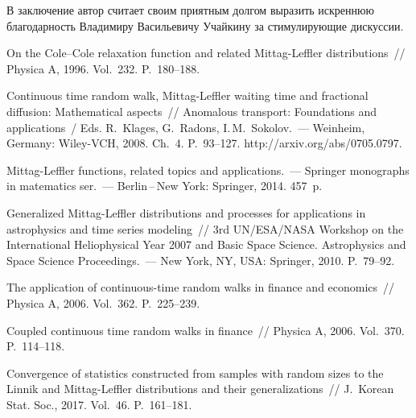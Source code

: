 \begin{multicols}{2}
\smallskip

В заключение автор считает своим приятным долгом выразить искреннюю
благодарность Владимиру Васильевичу Учайкину за стимулирующие
дискуссии.

\vspace*{-6pt}

{\small\frenchspacing
 {%
 \begin{thebibliography}{99}
 
 \vspace*{-2pt}
 
 On the Cole--Cole relaxation function and
related Mittag-Leffler distributions~// Physica A, 1996. Vol.~232.
P.~180--188.

 Continuous time random walk,
Mittag-Leffler waiting time and fractional diffusion: Mathematical
aspects~// Anomalous transport: Foundations and applications~/ Eds.
R.~Klages, G.~Radons,  I.\,M.~Sokolov.~--- Weinheim,
Germany: Wiley-VCH, 2008. Ch.~4. P.~93--127. 
{\sf http://arxiv.org/abs/0705.0797}.

{Mittag-Leffler functions, related topics and applications}.~---
Springer monographs in matematics ser.~---
Berlin\,--\,New York: Springer, 2014. 457~p.



 Generalized
Mittag-Leffler distributions and processes for applications in
astrophysics and time series modeling~// 3rd
UN/ESA/NASA Workshop on the International Heliophysical Year 2007
and Basic Space Science. Astrophysics and Space Science Proceedings.~--- 
New York, NY, USA: Springer, 2010. P.~79--92.



The application of continuous-time random
walks in finance and economics~// Physica A, 2006. Vol.~362. P.~225--239.

Coupled continuous time random walks in finance~// Physica A, 2006.
Vol.~370. P.~114--118.

 Convergence of statistics
constructed from samples with random sizes to the Linnik and
Mittag-Leffler distributions and their generalizations~// 
J.~Korean Stat. Soc., 2017. Vol.~46. P.~161--181.


\end{thebibliography}}}
\end{multicols}
